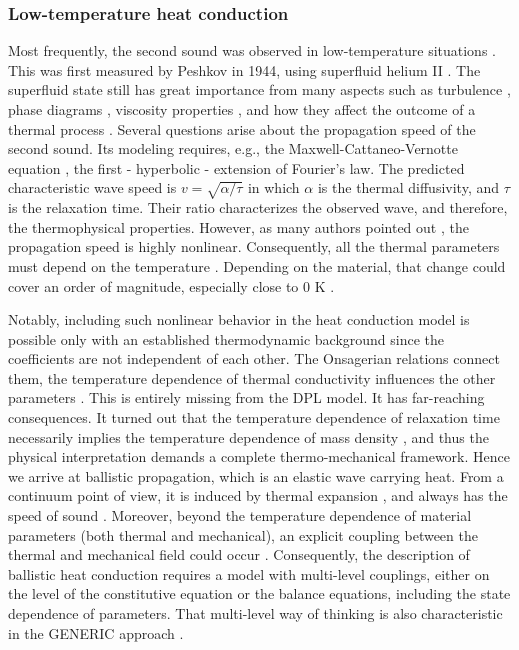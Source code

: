 \documentclass[sn-mathphys]{sn-jnl}%
\theoremstyle{thmstyleone}%
\theoremstyle{thmstyletwo}%
\theoremstyle{thmstylethree}%
\begin{document}
{%
\subsubsection{Low-temperature heat conduction}
Most frequently, the second sound was observed in low-temperature situations \cite{NarDyn72a, NarDyn75, Naretal75}. This was first measured by Peshkov in 1944, using superfluid helium II \cite{Pesh44}. The superfluid state still has great importance from many aspects such as turbulence \cite{MongEtal18, SalJou20, SciEtal19, BewEtal06}, phase diagrams \cite{KimCha04, VollWolf13b}, viscosity properties \cite{London54b}, and how they affect the outcome of a thermal process \cite{HohMar65, Putt74, Dres82b, Dres84b}. Several questions arise about the propagation speed of the second sound. Its modeling requires, e.g., the Maxwell-Cattaneo-Vernotte equation \cite{Max867a,Cat48a, Ver58a1}, the first - hyperbolic - extension of Fourier's law. The predicted characteristic wave speed is $v=\sqrt{\alpha/\tau}$ in which $\alpha$ is the thermal diffusivity, and $\tau$ is the relaxation time. Their ratio characterizes the observed wave, and therefore, the thermophysical properties. However, as many authors pointed out \cite{LaneEtal46, MauHer49, WaWi51, Pell49}, the propagation speed is highly nonlinear. Consequently, all the thermal parameters must depend on the temperature \cite{MasRom17}. Depending on the material, that change could cover an order of magnitude, especially close to $0$ K \cite{AtkOsb50, JacWal71, JacWalMcN70}. 

{ Notably, including such nonlinear behavior in the heat conduction model is possible only with an established thermodynamic background since the coefficients are not independent of each other. The Onsagerian relations connect them, the temperature dependence of thermal conductivity influences the other parameters \cite{KovRog20}. This is entirely missing from the DPL model.} It has far-reaching consequences. It turned out that the temperature dependence of relaxation time necessarily implies the temperature dependence of mass density \cite{KovRog20}, and thus the physical interpretation demands a complete thermo-mechanical framework. Hence we arrive at ballistic propagation, which is an elastic wave carrying heat. From a continuum point of view, it is induced by thermal expansion \cite{FriCim95, FriCim96, FriCim98, BallEtal20}, and always has the speed of sound \cite{McN74t}. Moreover, beyond the temperature dependence of material parameters (both thermal and mechanical), an explicit coupling between the thermal and mechanical field could occur \cite{DreStr93a,KovVan15a}. Consequently, the description of ballistic heat conduction requires a model with multi-level couplings, either on the level of the constitutive equation or the balance equations, including the state dependence of parameters. That multi-level way of thinking is also characteristic in the GENERIC approach \cite{Grmela2018b, PavEta18b}.

}
\end{document}

